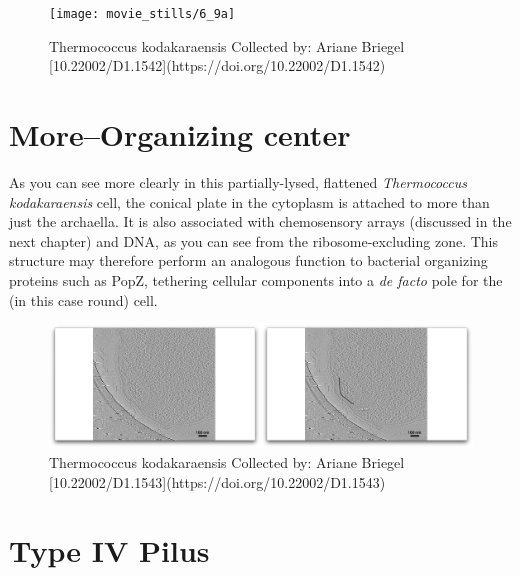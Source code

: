 \documentclass[]{tufte-book}
\begin{document}
\begin{figure}
\texttt{[image: movie\_stills/6\_9a]} \caption[Thermococcus kodakaraensis Collected by]{Thermococcus kodakaraensis Collected by: Ariane Briegel [10.22002/D1.1542](https://doi.org/10.22002/D1.1542)}\label{fig:unnamed-chunk-116}
\end{figure}

\hypertarget{moreorganizing-center}{\section{More--Organizing
center}\label{moreorganizing-center}}

As you can see more clearly in this partially-lysed, flattened
\emph{Thermococcus kodakaraensis} cell, the conical plate in the
cytoplasm is attached to more than just the archaella. It is also
associated with chemosensory arrays (discussed in the next chapter) and
DNA, as you can see from the ribosome-excluding zone. This structure may
therefore perform an analogous function to bacterial organizing proteins
such as PopZ, tethering cellular components into a \emph{de facto} pole
for the (in this case round) cell.

\begin{figure}
\includegraphics{movie_stills/6_9b} \caption[Thermococcus kodakaraensis Collected by]{Thermococcus kodakaraensis Collected by: Ariane Briegel [10.22002/D1.1543](https://doi.org/10.22002/D1.1543)}\label{fig:unnamed-chunk-117}
\end{figure}

\section{Type IV Pilus}\label{type-iv-pilus}
\end{document}
